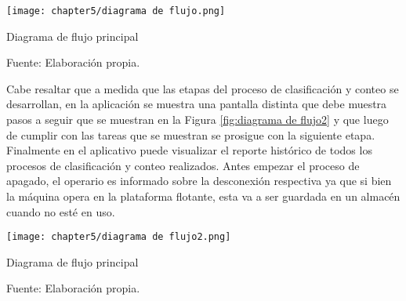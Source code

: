 \begin{myfigure}[H]
	\footnotesize\centering
	\texttt{[image: chapter5/diagrama de flujo.png]}
	\caption{Diagrama de flujo principal}
	\begin{myflushcenter}
		Fuente: Elaboración propia.
	\end{myflushcenter}
	\label{fig:diagrama de flujo}
\end{myfigure}

Cabe resaltar que a medida que las etapas del proceso de clasificación y conteo se desarrollan, en la aplicación se muestra una pantalla distinta que debe muestra pasos a seguir que se muestran en la Figura \ref{fig:diagrama de flujo2} y que luego de cumplir con las tareas que se muestran se prosigue con la siguiente etapa. Finalmente en el aplicativo puede visualizar el reporte histórico de todos los procesos de clasificación y conteo realizados. Antes empezar el proceso de apagado, el operario es informado sobre la desconexión respectiva ya que si bien la máquina opera en la plataforma flotante, esta va a ser guardada en un almacén cuando no esté en uso.

\begin{myfigure}[H]
	\footnotesize\centering
	\texttt{[image: chapter5/diagrama de flujo2.png]}
	\caption{Diagrama de flujo principal}
	\begin{myflushcenter}
		Fuente: Elaboración propia.
	\end{myflushcenter}
	\label{fig:diagrama de flujo2}
\end{myfigure}
